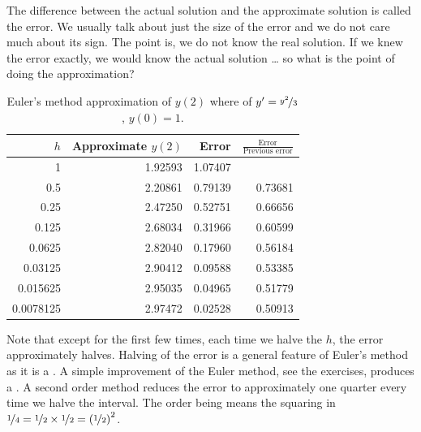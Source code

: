 The difference between the actual solution and the approximate solution is
called the error.  We usually talk about just the size of the error
and we do not care much about its sign.  The point is, we
do not know the real solution.
If we knew the error exactly, we would know the actual solution \ldots
so what is the point of doing the approximation?

\begin{table}[h!t]
\mybeginframe
\capstart
\begin{center}
\begin{tabular}{@{}rrrr@{}}
\toprule
$h$ & Approximate $y(2)$ & Error & $\frac{\text{Error}}{\text{Previous error}}$ \\
\midrule
1        & 1.92593 & 1.07407 & \\
0.5      & 2.20861 & 0.79139 & 0.73681 \\
0.25     & 2.47250 & 0.52751 & 0.66656 \\
0.125    & 2.68034 & 0.31966 & 0.60599 \\
0.0625   & 2.82040 & 0.17960 & 0.56184 \\
0.03125  & 2.90412 & 0.09588 & 0.53385 \\
0.015625 & 2.95035 & 0.04965 & 0.51779 \\
0.0078125& 2.97472 & 0.02528 & 0.50913 \\
\bottomrule
\end{tabular}
\end{center}
\caption{Euler's method approximation of $y(2)$ where
of $y'=\nicefrac{y^2}{3}$, $y(0)=1$.\label{euler-table:table}}
\myendframe
\end{table}

Note that except for the first few times, each time we halve 
the $h$, the error approximately halves.
Halving of the error is a general feature of Euler's method as it is a
\emph{}.
A simple improvement of the Euler method, see the exercises,
produces a .
A second order method
reduces the error to approximately one
quarter every time we halve the interval.  The order being
 means the squaring in
$\nicefrac{1}{4} = \nicefrac{1}{2} \times \nicefrac{1}{2}
= {(\nicefrac{1}{2})}^2$.

